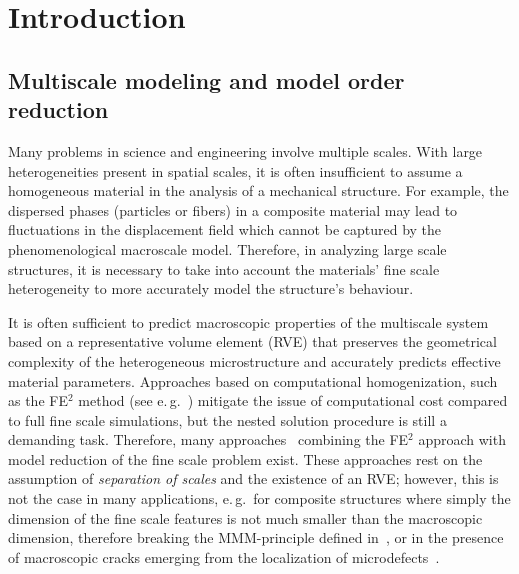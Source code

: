 \documentclass[AMA,STIX1COL,doublespace]{WileyNJD-v2}
\begin{document}

\maketitle

\section{Introduction}%
\label{sec:introduction}

\subsection{Multiscale modeling and model order reduction}%
\label{sub:multiscale_modeling_and_model_order_reduction}

Many problems in science and engineering involve multiple scales. 
With large heterogeneities present in spatial scales,
it is often insufficient to assume a homogeneous material in the analysis of a mechanical structure.
For example, the dispersed phases (particles or fibers) in a composite material may lead to fluctuations in the displacement field which cannot be captured by the phenomenological macroscale model. 
Therefore, in analyzing large scale structures, it is necessary to take into account the materials' fine scale heterogeneity to more accurately model the structure's behaviour.

It is often sufficient to predict macroscopic properties of the multiscale system based on a representative volume element (RVE) that preserves the geometrical complexity of the heterogeneous microstructure and accurately predicts effective material parameters.
Approaches based on computational homogenization, such as the FE$^2$ method (see e.\,g.~\cite{MieheKoch2002,FeyelCaboche2000,GeersKouznetsovaEtAl2010a,GeersKouznetsovaEtAl2010}) mitigate the issue of computational cost compared to full fine scale simulations, but the nested solution procedure is still a demanding task.
Therefore, many approaches~\cite{YvonnetHe2007,GouryKerfridenEtAl2014,HernandezOliverEtAl2014,GuoRokosVeroy2021} combining the FE$^2$ approach with model reduction of the fine scale problem exist.
These approaches rest on the assumption of \textit{separation of scales} and the
existence of an RVE\@; however, this is not the case in many applications,
e.\,g.\, for composite structures where simply the dimension of the fine scale
features is not much smaller than the macroscopic dimension, therefore breaking
the MMM-principle defined in~\cite{Hashin1983}, or in the presence of macroscopic
cracks emerging from the localization of microdefects~\cite{Gitman2006,GitmanEtAl2007}.
\end{document}
